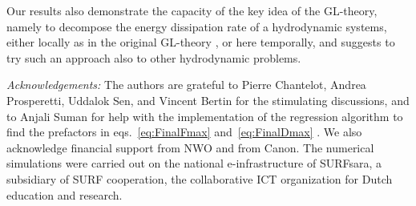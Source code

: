 \documentclass[preprint,amssymb,superscriptaddress,aps,prl,floatfix]{revtex4-1}
\begin{document}
Our results also demonstrate the capacity of the key idea of 
the GL-theory, namely to decompose the energy dissipation rate 
of a hydrodynamic systems, either locally as in the original GL-theory
\cite{grossmann2000scaling,grossmann2001thermal},
or here temporally, and suggests to try such an approach also to
other hydrodynamic problems. 


\begin{acknowledgments}
{\it Acknowledgements:} The authors are grateful to Pierre Chantelot, Andrea Prosperetti, Uddalok Sen, and Vincent Bertin for the stimulating discussions, and 
to Anjali Suman for help with the implementation of the regression algorithm to find the prefactors in eqs.~\eqref{eq:FinalFmax} and~\eqref{eq:FinalDmax} \cite{supplMaterial}.
We also acknowledge financial support from NWO and from Canon. 
The numerical simulations were carried out on the national e-infrastructure of SURFsara, a subsidiary of SURF cooperation, the collaborative ICT organization for Dutch education and research. 
\end{acknowledgments}

\vspace{-5mm}


\end{document}
